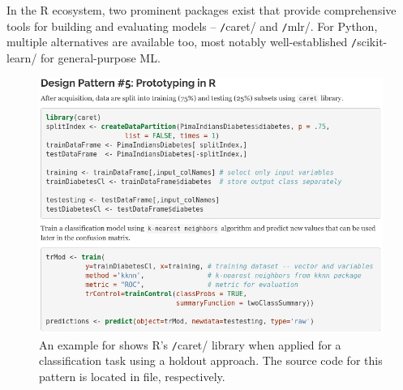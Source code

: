 In the R ecosystem, two prominent packages exist that provide comprehensive tools for building and evaluating models -- \texttt/caret/ and \texttt/mlr/. 
For Python, multiple alternatives are available too, most notably well-established \texttt/scikit-learn/ for general-purpose \ac{ML}. 

\begin{figure}[!ht]
\centering
\includegraphics[width=\textwidth+2cm,height=\textheight,keepaspectratio]{images_dp/code_listing_5_prototype}
\caption[Example for Prototyping Design Pattern.]{An example for  shows R's \texttt/caret/ library when applied for a classification task using a holdout approach.
The source code for this pattern is located in  file,  respectively.}
\label{lst:code_pattern5}
\end{figure}

